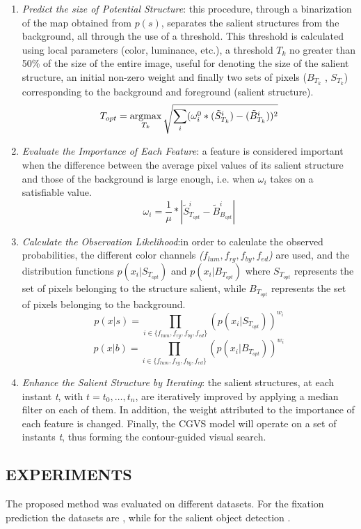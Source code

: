 \begin{enumerate}
    \item \emph{Predict the size of Potential Structure}: this procedure, through a binarization 
    of the map obtained from $ p(s) $, separates the salient structures 
    from the background, all through the use of a threshold. This 
    threshold is calculated using local parameters (color, luminance, etc.), 
    a threshold $ T_k $ no greater than 50\% of the size of the entire image, useful 
    for denoting the size of the salient structure, an initial non-zero 
    weight and finally two sets of pixels ($ B_{T_k}$ , $ S_{T_k}$) corresponding to the background 
    and foreground (salient structure).
    $$ T_{opt} = \operatorname*{argmax}\limits_{T_k} \sqrt{\sum_{i} (\omega_i^0*(\tilde{S}^i_{T_{k}}) - (\tilde{B}^i_{T_{k}}))^2} $$
    \item \emph{Evaluate the Importance of Each Feature}: a feature is considered important 
    when the difference between the average pixel values of its 
    salient structure and those of the background is large enough, i.e. when $ \omega_i $ 
    takes on a satisfiable value.
    $$ \omega_i = \frac{1}{\mu} * | \tilde{S}^i_{T_{opt}} - \tilde{B}^i_{B_{opt}} |$$
    \item \emph{Calculate the Observation Likelihood}:in order to calculate the observed 
    probabilities, the different color channels \emph{($ f_{lum}, f_{rg}, f_{by}, f_{ed} $)} are used, 
    and the distribution functions $ p(x_i | S_{T_{opt}}) $ and $ p(x_i | B_{T_{opt}}) $ where $ S_{T_{opt}} $ 
    represents the set of pixels belonging to the structure salient, while 
    $ B_{T_{opt}} $ represents the set of pixels belonging to the background.
    $$ p(x|s) = \prod_{i \in {\{} f_{lum}, f_{rg}, f_{by}, f_{ed} {\}}} {(p(x_i | S_{T_{opt}}))^{w_i}} $$
    $$ p(x|b) = \prod_{i \in {\{} f_{lum}, f_{rg}, f_{by}, f_{ed} {\}}} {(p(x_i | B_{T_{opt}}))^{w_i}} $$
    \item \emph{Enhance the Salient Structure by Iterating}: the salient structures, at 
    each instant \emph{t}, with $ t = t_0,…, t_n $, are iteratively improved by applying 
    a median filter on each of them. In addition, the weight attributed to 
    the importance of each feature is changed. Finally, the CGVS model 
    will operate on a set of instants \emph{t}, thus forming the contour-guided 
    visual search.
\end{enumerate}

\subsection{EXPERIMENTS}
The proposed method was evaluated on different datasets. For the fixation 
prediction the datasets are \cite{0747815530} \cite{0747815531} \cite{0747815579}, while for the salient object detection \cite{0747815506} \cite{0747815508} \cite{0747815518}.

